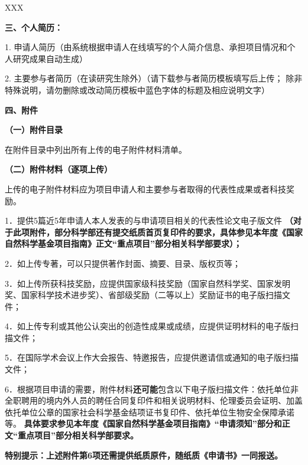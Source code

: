 \documentclass[a4paper,12pt]{article}
\newcommand{\NSFCblue}[1]{{\color{NSFCblue} #1}}
\begin{document}
XXX

\textbf{三、个人简历：}

1. 申请人简历（由系统根据申请人在线填写的个人简介信息、承担项目情况和个人研究成果自动生成）

2. 主要参与者简历（在读研究生除外）（请下载参与者简历模板填写后上传；\NSFCblue{除非特殊说明，请勿删除或改动简历模板中蓝色字体的标题及相应说明文字）}

\textbf{四、附件}

\textbf{（一）附件目录}

在附件目录中列出所有上传的电子附件材料清单。

\textbf{（二）附件材料（逐项上传）}

上传的电子附件材料应为项目申请人和主要参与者取得的代表性成果或者科技奖励。

1．提供5篇近5年申请人本人发表的与申请项目相关的代表性论文电子版文件
\textbf{（对于此项附件，部分科学部还有提交纸质首页复印件的要求，具体参见本年度《国家自然科学基金项目指南》正文“重点项目”部分相关科学部要求）；}

2．如上传专著，可以只提供著作封面、摘要、目录、版权页等；

3．如上传所获科技奖励，应提供国家级科技奖励（国家自然科学奖、国家发明奖、国家科学技术进步奖）、省部级奖励（二等以上）奖励证书的电子版扫描文件；

4．如上传专利或其他公认突出的创造性成果或成绩，应提供证明材料的电子版扫描文件；

5．在国际学术会议上作大会报告、特邀报告，应提供邀请信或通知的电子版扫描文件；

6．根据项目申请的需要，附件材料\textbf{还可能}包含以下电子版扫描文件：依托单位非全职聘用的境内外人员的聘任合同复印件和相关说明材料、伦理委员会证明、加盖依托单位公章的国家社会科学基金结项证书复印件、依托单位生物安全保障承诺等。
\textbf{具体要求参见本年度《国家自然科学基金项目指南》“申请须知”部分和正文“重点项目”部分相关科学部要求。}

\textbf{特别提示：上述附件第6项还需提供纸质原件，随纸质《申请书》一同报送。}
\end{document}
